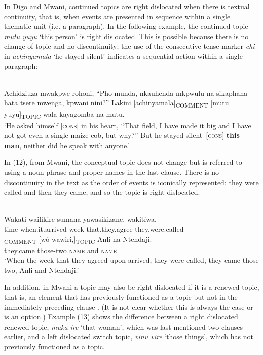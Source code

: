 \documentclass[output=paper]{langsci/langscibook}
\begin{document}
In Digo and Mwani, continued topics are right dislocated when there is textual continuity, that is, when events are presented in sequence within a single thematic unit (i.e. a paragraph). In the following example, the continued topic \textit{mutu yuyu} ‘this person’ is right dislocated. This is possible because there is no change of topic and no discontinuity; the use of the consecutive tense marker \textit{chi}\textit{\nobreakdash-} in \textit{a}\textit{chi}\textit{nyamala} ‘he stayed silent’ indicates a sequential action within a single paragraph:

\ea\label{ex:}
\\
Achidziuza mwakpwe rohoni, “Pho munda, nkauhenda mkpwulu na sikaphaha hata tsere mwenga, kpwani nini?” Lakini [achinyamala]\textsubscript{COMMENT} [mutu yuyu]\textsubscript{TOPIC} wala kayagomba na mutu.\\
\glt \textup{‘}\textup{He}\textup{ asked himself [}\textsc{cons}\textup{] in his heart, “That field, I have made it big and I have not got even a single maize cob, but why?” But }\textup{he stayed silent}\textup{~[}\textsc{cons}\textup{] }\textbf{\textup{this man}}\textup{, neither did he speak with anyone.’}
\z

In (12), from Mwani, the conceptual topic does not change but is referred to using a noun phrase and proper names in the last clause. There is no discontinuity in the text as the order of events is iconically represented: they were called and then they came, and so the topic is right dislocated.

\ea\label{ex:}
\\
\gll Wakati waifikire sumana yawasikizane, wakitíwa,\\
time when.it.arrived week that.they.agree they.were.called\\


\gll [wakíja]\textsubscript{COMMENT} [wó-wawiri,]\textsubscript{TOPIC} Anli na Ntendaji.\\
they.came those-two \textsc{name }and \textsc{name}\\


\glt \textup{‘}\textup{When the week that they agreed upon arrived, they were called, they came those two, Anli and Ntendaji.’}
\z

In addition, in Mwani a topic may also be right dislocated if it is a renewed topic, that is, an element that has previously functioned as a topic but not in the immediately preceding clause \citep[10-11]{Floor2005}. (It is not clear whether this is always the case or is an option.) Example (13) shows the difference between a right dislocated renewed topic, \textit{muk}\textit{a ire} ‘that woman’, which was last mentioned two clauses earlier, and a left dislocated switch topic, \textit{vinu vire} ‘those things’, which has not previously functioned as a topic.
\end{document}
